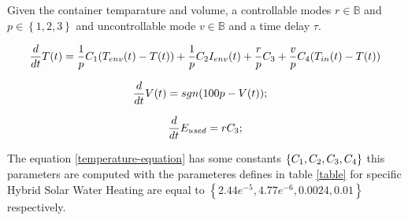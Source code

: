 \documentclass[a4paper,12pt]{book}
\begin{document}
    Given the container temparature and volume, a controllable modes $r \in \mathbb{B}$
    and $p \in \left\lbrace1,2,3\right\rbrace $ and uncontrollable mode
    $v \in \mathbb{B} $ and a time delay $\tau$.


    
    \begin{equation}
    \frac{d}{dt}T(t) =   \frac{1}{p}  C_1(T_{env}(t)-T(t))+ \frac{1}{p} C_{2}I_{env}(t)+  \frac{r}{p} C_{3} +  \frac{v}{p} C_{4}(T_{in}(t)-T(t))
    \label{temperature-equation}
    \end{equation}

    \begin{equation}
    \frac{d}{dt}V(t) = sgn(100p - V(t)); \quad
    \label{volume-equation}
    \end{equation}

    \begin{equation} 
    \frac{d}{dt}E_{used} =  r C_{3} ;
    \label{Energy-equation}
    \end{equation}

    The equation \ref{temperature-equation} has some constants $\left\lbrace 
    C_1, C_{2}, C_{3}, C_{4} \right\rbrace $ this
    parameters are computed with the parameteres defines in table \ref{table} for specific Hybrid Solar Water Heating
    are equal to $\left\lbrace 2.44e^{-5},  4.77e^{-6}
    , 0.0024, 0.01  \right\rbrace$ respectively.





    



    
\end{document}
